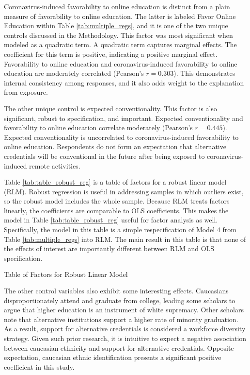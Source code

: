 \documentclass[review]{elsarticle}
\begin{document}
Coronavirus-induced favorability to online education is distinct from a plain measure of favorability to online education.
The latter is labeled Favor Online Education within Table \ref{tab:multiple_regs},
and it is one of the two unique controls discussed in the Methodology.
This factor was most significant when modeled as a quadratic term.
A quadratic term captures marginal effects.
The coefficient for this term is positive, indicating a positive marginal effect.
Favorability to online education
and coronavirus-induced favorability to online education are moderately correlated (Pearson's $r=0.303$).
This demonstrates internal consistency among responses,
and it also adds weight to the explanation from exposure.

The other unique control is expected conventionality.
This factor is also significant, robust to specification, and important.
Expected conventionality and favorability to online education correlate moderately (Pearson's $r=0.445$).
Expected conventionality is uncorrelated to coronavirus-induced favorability to online education.
Respondents do not form an expectation that alternative credentials will be conventional in the future
after being exposed to coronavirus-induced remote activities.

Table \ref{tab:table_robust_reg} is a table of factors for a robust linear model (RLM).
Robust regression is useful in addressing samples in which outliers exist, so the robust model includes the whole sample.
Because RLM treats factors linearly, the coefficients are comparable to OLS coefficients.
This makes the model in Table \ref{tab:table_robust_reg} useful for factor analysis as well.
Specifically, the model in this table is a simple respecification of Model 4 from Table \ref{tab:multiple_regs} into RLM.
The main result in this table is that none of the effects of interest are importantly different between RLM and OLS specification.

\begin{table}
    \caption{Table of Factors for Robust Linear Model}
    \resizebox{\columnwidth}{!}{
        
    }
    \label{tab:table_robust_reg}
\end{table}

The other control variables also exhibit some interesting effects.
Caucasians disproportionately attend and graduate from college,
leading some scholars to argue that higher education is an instrument of white supremacy\cite{hikido2016whitened, dennis2001skillful}.
Other scholars note that alternative institutions support a higher rate of minority graduation.
As a result, support for alternative credentials is considered a workforce diversity strategy\cite{brown2017complex, jones2018alternative, rossiter2019designing}.
Given such prior research,
it is intuitive to expect a negative association between caucasian ethnicity and support for alternative credentials.
Opposite expectation, caucasian ethnic identification presents a significant positive coefficient in this study.
\end{document}
